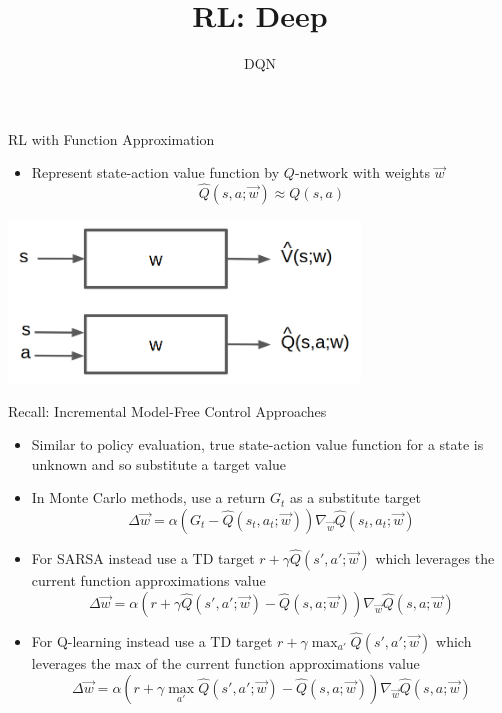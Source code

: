 


\title[Reinforcement Learning: Deep Reinforcement Learning]{RL: Deep}
\subtitle{DQN}




	
	\maketitle

\begin{frame}[c]{RL with Function Approximation}
	
\begin{itemize}
	\item Represent state-action value function by $Q$-network with weights $\vec{w}$
	$$\hat{Q}(s,a;\vec{w}) \approx Q(s,a)$$
\end{itemize}

\centering
\includegraphics[width=0.7\textwidth]{../w05_function_approx/images/vfa.png}


\end{frame}
\begin{frame}[c]{Recall: Incremental Model-Free Control Approaches}
	
\begin{itemize}
	\item Similar to policy evaluation, true state-action value function for a state is unknown and so substitute a target value
	\item In Monte Carlo methods, use a return $G_t$ as a substitute target
	$$\Delta \vec{w} = \alpha(G_t - \hat{Q}(s_t,a_t; \vec{w})) \nabla_{\vec{w}} \hat{Q}(s_t, a_t; \vec{w}) $$
	\item For SARSA instead use a TD target $r+ \gamma \hat{Q}(s', a'; \vec{w})$ which leverages the current function approximations value
	$$\Delta \vec{w} = \alpha (r + \gamma \hat{Q}(s',a';\vec{w}) - \hat{Q}(s,a;\vec{w})) \nabla_{\vec{w}}\hat{Q}(s,a;\vec{w}) $$
	\item For Q-learning instead use a TD target $r + \gamma \max_{a'} \hat{Q}(s',a';\vec{w})$ which leverages the max of the current function approximations value
	$$\Delta \vec{w} = \alpha (r + \gamma \max_{a'} \hat{Q}(s',a';\vec{w}) - \hat{Q}(s,a;\vec{w})) \nabla_{\vec{w}}\hat{Q}(s,a;\vec{w}) $$
\end{itemize}
	
\end{frame}
